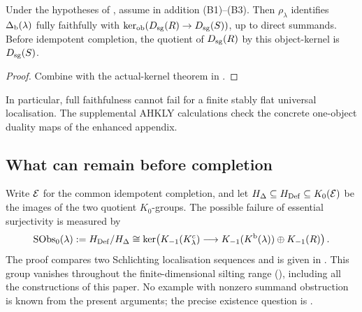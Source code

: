 \begin{corollary}\label{cor:unconditional-kernel}
Under the hypotheses of , assume in addition \textup{(B1)--(B3)}.  Then \(\rho_\lambda\) identifies \(\Delta_{\mathrm b}(\lambda)\) fully faithfully with \(\ker_{\mathrm{ob}}(D_{\mathrm{sg}}(R)\to D_{\mathrm{sg}}(S))\), up to direct summands.  Before idempotent completion, the quotient of \(D_{\mathrm{sg}}(R)\) by this object-kernel is \(D_{\mathrm{sg}}(S)\).
\end{corollary}

\begin{proof}
Combine  with the actual-kernel theorem in .
\end{proof}

\begin{remark}\label{cor:no-beta}
In particular, full faithfulness cannot fail for a finite stably flat universal localisation. The supplemental AHKLY calculations check the concrete one-object duality maps of the enhanced appendix.
\end{remark}


\subsection{What can remain before completion}
Write \(\mathcal E\) for the common idempotent completion, and let \(H_\Delta\subseteq H_{\mathrm{Def}}\subseteq K_0(\mathcal E)\) be the images of the two quotient \(K_0\)-groups. The possible failure of essential surjectivity is measured by
\[
 \operatorname{SObs}_0(\lambda):=H_{\mathrm{Def}}/H_\Delta
 \cong\ker\!\left(K_{-1}(K^c_\lambda)
 \longrightarrow K_{-1}(K^{\mathrm b}(\lambda))\oplus K_{-1}(R)\right).
\]
The proof compares two Schlichting localisation sequences and is given in . This group vanishes throughout the finite-dimensional silting range (), including all the constructions of this paper. No example with nonzero summand obstruction is known from the present arguments; the precise existence question is .
